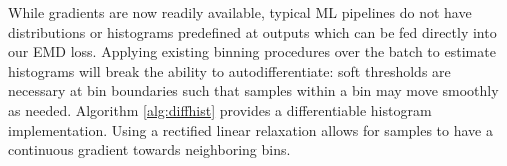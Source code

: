 While gradients are now readily available, typical ML pipelines do not have distributions or histograms predefined at outputs which can be fed directly into 
our EMD loss. Applying existing binning procedures over the batch to estimate histograms will break the ability to autodifferentiate: soft thresholds are necessary at bin boundaries such that samples within a bin may move smoothly as needed. Algorithm \ref{alg:diffhist} provides a differentiable histogram implementation. Using a rectified linear relaxation allows for samples to have a continuous gradient towards neighboring bins.